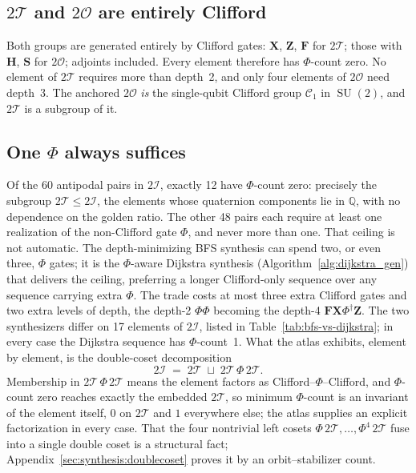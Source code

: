 \documentclass[11pt, oneside, openany]{scrbook}
\DeclareMathOperator{\SU}{SU}
\newcommand{\Tgroup}{\mathcal{T}}  %
\newcommand{\Ogroup}{\mathcal{O}}  %
\newcommand{\Igroup}{\mathcal{I}}  %
\newcommand{\TwoT}{2\Tgroup}
\newcommand{\TwoO}{2\Ogroup}
\newcommand{\TwoI}{2\Igroup}
\begin{document}
\subsection{\texorpdfstring{$\TwoT$}{2T} and \texorpdfstring{$\TwoO$}{2O} are entirely Clifford}

Both groups are generated entirely by Clifford gates: $\mathbf{X}$, $\mathbf{Z}$, $\mathbf{F}$ for $\TwoT$; those with $\mathbf{H}$, $\mathbf{S}$ for $\TwoO$; adjoints included. Every element therefore has $\Phi$-count zero. No element of $\TwoT$ requires more than depth~2, and only four elements of $\TwoO$ need depth~3. The anchored $\TwoO$ \textit{is} the single-qubit Clifford group $\mathcal{C}_1$ in $\SU(2)$, and $\TwoT$ is a subgroup of it.

\subsection{One \texorpdfstring{$\Phi$}{Φ} always suffices} \label{subsec:one-phi-suffices}

Of the 60 antipodal pairs in $\TwoI$, exactly 12 have $\Phi$-count zero: precisely the subgroup $\TwoT \leq \TwoI$, the elements whose quaternion components lie in $\mathbb{Q}$, with no dependence on the golden ratio. The other 48 pairs each require at least one realization of the non-Clifford gate $\Phi$, and never more than one. That ceiling is not automatic. The depth-minimizing BFS synthesis can spend two, or even three, $\Phi$ gates; it is the $\Phi$-aware Dijkstra synthesis (Algorithm~\ref{alg:dijkstra_gen}) that delivers the ceiling, preferring a longer Clifford-only sequence over any sequence carrying extra $\Phi$. The trade costs at most three extra Clifford gates and two extra levels of depth, the depth-2 $\Phi\Phi$ becoming the depth-4 $\mathbf{F}\mathbf{X}\Phi^\dagger \mathbf{Z}$. The two synthesizers differ on 17 elements of $\TwoI$, listed in Table~\ref{tab:bfs-vs-dijkstra}; in every case the Dijkstra sequence has $\Phi$-count~1. What the atlas exhibits, element by element, is the double-coset decomposition
\begin{equation*}
    \TwoI \;=\; \TwoT \;\sqcup\; \TwoT\,\Phi\,\TwoT.
\end{equation*}
Membership in $\TwoT\,\Phi\,\TwoT$ means the element factors as Clifford--$\Phi$--Clifford, and $\Phi$-count zero reaches exactly the embedded $\TwoT$, so minimum $\Phi$-count is an invariant of the element itself, $0$ on $\TwoT$ and $1$ everywhere else; the atlas supplies an explicit factorization in every case. That the four nontrivial left cosets $\Phi\,\TwoT, \dots, \Phi^4\,\TwoT$ fuse into a single double coset is a structural fact; Appendix~\ref{sec:synthesis:doublecoset} proves it by an orbit--stabilizer count.
\end{document}
